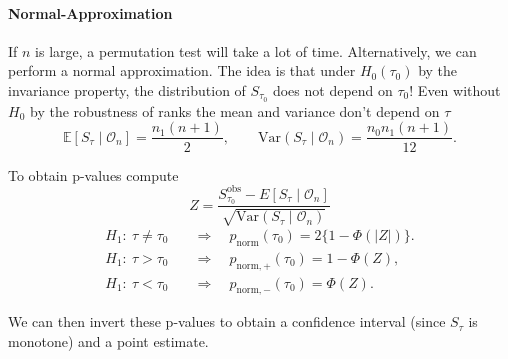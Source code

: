\documentclass[11pt]{exam}
\theoremstyle{plain}
\newcommand{\lt}{\left}
\newcommand{\rt}{\right}
\newcommand{\Ind}[1]{\mathds{1}_{\lt\{ #1 \rt\}}}
\begin{document}
\paragraph{Normal-Approximation}
If $n$ is large, a permutation test will take a lot of time. Alternatively, we can perform a normal approximation. The idea is that under $H_0(\tau_0)$ by the invariance property, the distribution of $S_{\tau_0}$ does not depend on $\tau_0$! Even without $H_0$ by the robustness of ranks the mean and variance don't depend on $\tau$
\[
\mathbb E[S_\tau\mid\mathcal O_n]=\frac{n_1(n+1)}{2},\qquad
\mathrm{Var}(S_\tau\mid\mathcal O_n)=\frac{n_0n_1(n+1)}{12}.
\]

To obtain p-values compute
\[
Z=\frac{S^{\text{obs}}_{\tau_0}-E[S_\tau\mid\mathcal O_n]}{\sqrt{\mathrm{Var}(S_\tau\mid\mathcal O_n)}}
\]
\begin{align*}
H_1:\ \tau \neq \tau_0 &\quad\Rightarrow\quad p_{\text{norm}}(\tau_0)=2\{1-\Phi(|Z|)\}.\\[2mm]
H_1:\ \tau>\tau_0 &\quad\Rightarrow\quad p_{\text{norm},+}(\tau_0)=1-\Phi(Z),\\[2mm]
H_1:\ \tau<\tau_0 &\quad\Rightarrow\quad p_{\text{norm},-}(\tau_0)=\Phi(Z).
\end{align*}

We can then invert these p-values to obtain a confidence interval (since $S_\tau$ is monotone) and a point estimate.


\end{document}
